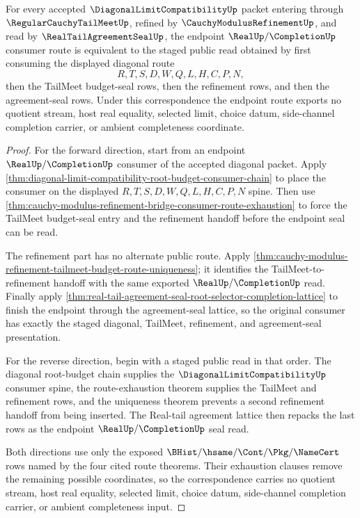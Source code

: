 \begin{theorem}
\label{thm:diagonal-limit-compatibility-root-tailmeet-refinement-real-seal-correspondence}
For every accepted $\DiagonalLimitCompatibilityUp$ packet entering through
$\RegularCauchyTailMeetUp$, refined by $\CauchyModulusRefinementUp$, and read
by $\RealTailAgreementSealUp$, the endpoint $\RealUp/\CompletionUp$ consumer
route is equivalent to the staged public read obtained by first consuming the
displayed diagonal route
$$
R,T,S,D,W,Q,L,H,C,P,N,
$$
then the TailMeet budget-seal rows, then the refinement rows, and then the
agreement-seal rows. Under this correspondence the endpoint route exports no
quotient stream, host real equality, selected limit, choice datum,
side-channel completion carrier, or ambient completeness coordinate.
\end{theorem}
\begin{proof}
For the forward direction, start from an endpoint $\RealUp/\CompletionUp$
consumer of the accepted diagonal packet. Apply
\autoref{thm:diagonal-limit-compatibility-root-budget-consumer-chain} to place
the consumer on the displayed $R,T,S,D,W,Q,L,H,C,P,N$ spine. Then use
\autoref{thm:cauchy-modulus-refinement-bridge-consumer-route-exhaustion} to
force the TailMeet budget-seal entry and the refinement handoff before the
endpoint seal can be read.

The refinement part has no alternate public route. Apply
\autoref{thm:cauchy-modulus-refinement-tailmeet-budget-route-uniqueness}; it
identifies the TailMeet-to-refinement handoff with the same exported
$\RealUp/\CompletionUp$ read. Finally apply
\autoref{thm:real-tail-agreement-seal-root-selector-completion-lattice} to
finish the endpoint through the agreement-seal lattice, so the original
consumer has exactly the staged diagonal, TailMeet, refinement, and
agreement-seal presentation.

For the reverse direction, begin with a staged public read in that order. The
diagonal root-budget chain supplies the $\DiagonalLimitCompatibilityUp$
consumer spine, the route-exhaustion theorem supplies the TailMeet and
refinement rows, and the uniqueness theorem prevents a second refinement
handoff from being inserted. The Real-tail agreement lattice then repacks the
last rows as the endpoint $\RealUp/\CompletionUp$ seal read.

Both directions use only the exposed $\BHist/\hsame/\Cont/\Pkg/\NameCert$
rows named by the four cited route theorems. Their exhaustion clauses remove
the remaining possible coordinates, so the correspondence carries no quotient
stream, host real equality, selected limit, choice datum, side-channel
completion carrier, or ambient completeness input.
\end{proof}

